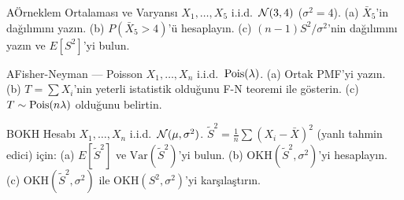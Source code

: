 
\cozumlualistirmalar

\begin{alistirma}[Al.11.1]{A}{Örneklem Ortalaması ve Varyansı}
$X_1,\ldots,X_5$ i.i.d.\ $\mathcal{N}(3, 4)$ ($\sigma^2=4$).
(a) $\bar{X}_5$'in dağılımını yazın.
(b) $P(\bar{X}_5 > 4)$'ü hesaplayın.
(c) $(n-1)S^2/\sigma^2$'nin dağılımını yazın ve $E[S^2]$'yi bulun.
\end{alistirma}

\begin{alistirma}[Al.11.2]{A}{Fisher-Neyman --- Poisson}
$X_1,\ldots,X_n$ i.i.d.\ $\operatorname{Pois}(\lambda)$.
(a) Ortak PMF'yi yazın. (b) $T = \sum X_i$'nin yeterli istatistik olduğunu F-N teoremi ile gösterin.
(c) $T \sim \operatorname{Pois}(n\lambda)$ olduğunu belirtin.
\end{alistirma}

\begin{alistirma}[Al.11.3]{B}{OKH Hesabı}
$X_1,\ldots,X_n$ i.i.d.\ $\mathcal{N}(\mu,\sigma^2)$.
$\tilde{S}^2 = \frac{1}{n}\sum(X_i-\bar{X})^2$ (yanlı tahmin edici) için:
(a) $E[\tilde{S}^2]$ ve $\mathrm{Var}(\tilde{S}^2)$'yi bulun.
(b) $\mathrm{OKH}(\tilde{S}^2, \sigma^2)$'yi hesaplayın.
(c) $\mathrm{OKH}(\tilde{S}^2,\sigma^2)$ ile $\mathrm{OKH}(S^2,\sigma^2)$'yi karşılaştırın.
\end{alistirma}

